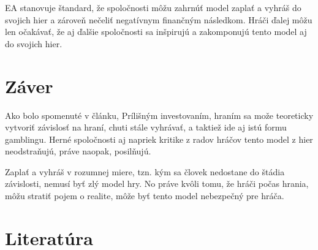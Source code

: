 \documentclass[10pt,twoside,slovak,a4paper]{article}
\begin{document}
EA stanovuje štandard, že spoločnosti môžu zahrnúť model zaplať a vyhráš do svojich hier a zároveň nečeliť negatívnym finančným následkom. Hráči ďalej môžu len očakávať, že aj ďalšie spoločnosti sa inšpirujú a zakomponujú tento model aj do svojich hier.\cite{2}


\section{Záver} 
Ako bolo spomenuté v článku, Prílišným investovaním, hraním sa može teoreticky vytvoriť závislosť na hraní, chuti stále vyhrávať, a taktiež ide aj istú formu gamblingu. Herné spoločnosti aj napriek kritike z radov hráčov tento model z hier neodstraňujú, práve naopak, posilňujú. 

Zaplať a vyhráš v rozumnej miere, tzn. kým sa človek nedostane do štádia závislosti, nemusí byť zlý model hry. No práve kvôli tomu, že hráči počas hrania, môžu stratiť pojem o realite, môže byť tento model nebezpečný pre hráča.
\section{Literatúra} 

 
\end{document}

